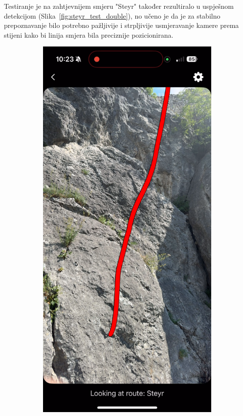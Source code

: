 Testiranje je na zahtjevnijem smjeru "Steyr" također rezultiralo u uspješnom detekcijom (Slika~\ref{fig:steyr_test_double}), no učeno je da je za stabilno prepoznavanje bilo potrebno pažljivije i strpljivije usmjeravanje kamere prema stijeni kako bi linija smjera bila preciznije pozicionirana. 

\begin{figure}[H]
    \centering
    \begin{subfigure}[b]{0.45\textwidth}
        \centering
        \includegraphics[width=\textwidth]{images/testiranje/steyr_test_left_side.png}

\end{subfigure}
\end{figure}
